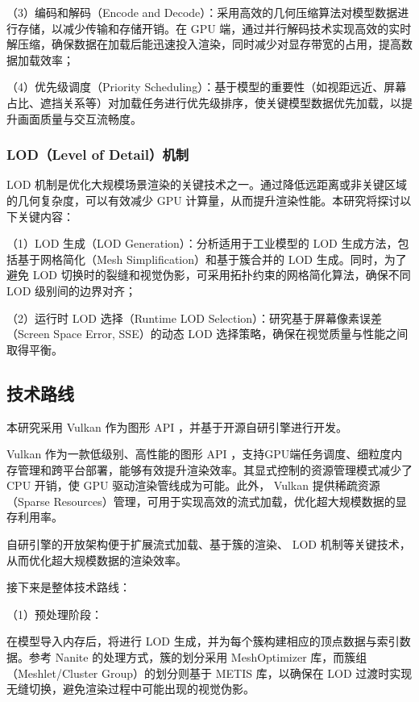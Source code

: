（3）编码和解码（Encode and Decode）：采用高效的几何压缩算法对模型数据进行存储，以减少传输和存储开销。在 GPU 端，通过并行解码技术实现高效的实时解压缩，确保数据在加载后能迅速投入渲染，同时减少对显存带宽的占用，提高数据加载效率\cite{Mlakar2024}；

（4）优先级调度（Priority Scheduling）：基于模型的重要性（如视距远近、屏幕占比、遮挡关系等）对加载任务进行优先级排序，使关键模型数据优先加载，以提升画面质量与交互流畅度。

\subsubsection{LOD（Level of Detail）机制}

LOD 机制是优化大规模场景渲染的关键技术之一。通过降低远距离或非关键区域的几何复杂度，可以有效减少 GPU 计算量，从而提升渲染性能\cite{Deng2017}。本研究将探讨以下关键内容：

（1）LOD 生成（LOD Generation）：分析适用于工业模型的 LOD 生成方法，包括基于网格简化（Mesh Simplification）和基于簇合并的 LOD 生成\cite{Jensen2023}。同时，为了避免 LOD 切换时的裂缝和视觉伪影，可采用拓扑约束的网格简化算法，确保不同 LOD 级别间的边界对齐；

（2）运行时 LOD 选择（Runtime LOD Selection）：研究基于屏幕像素误差（Screen Space Error, SSE）的动态 LOD 选择策略，确保在视觉质量与性能之间取得平衡\cite{WangQian2016}。

\subsection{技术路线}

本研究采用 Vulkan 作为图形 API ，并基于开源自研引擎进行开发。

Vulkan 作为一款低级别、高性能的图形 API ，支持GPU端任务调度、细粒度内存管理和跨平台部署，能够有效提升渲染效率\cite{overvoorde2020vulkan}。其显式控制的资源管理模式减少了 CPU 开销，使 GPU 驱动渲染管线成为可能。此外， Vulkan 提供稀疏资源（Sparse Resources）管理，可用于实现高效的流式加载，优化超大规模数据的显存利用率。

自研引擎的开放架构便于扩展流式加载、基于簇的渲染、 LOD 机制等关键技术，从而优化超大规模数据的渲染效率。

接下来是整体技术路线：

（1）预处理阶段：

在模型导入内存后，将进行 LOD 生成，并为每个簇构建相应的顶点数据与索引数据。参考 Nanite 的处理方式，簇的划分采用 MeshOptimizer 库，而簇组（Meshlet/Cluster Group）的划分则基于 METIS 库，以确保在 LOD 过渡时实现无缝切换，避免渲染过程中可能出现的视觉伪影。

